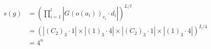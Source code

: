 \documentclass[preview]{standalone}
\begin{document}
\begin{align*}
s(g) &= \left(\prod_{i=1}^{l}\left|G(o(a_i))_{c_i}\cdot d_i\right|\right)^{L/l} \\   &= \left(\left|(C_2)_3\cdot 1\right| \times \left|(1)_3\cdot 4\right|\times \left|(C_2)_3\cdot 1\right| \times \left|(1)_3\cdot 4\right|\right)^{L/4} \\   &= 4^{n}
\end{align*}
\end{document}
